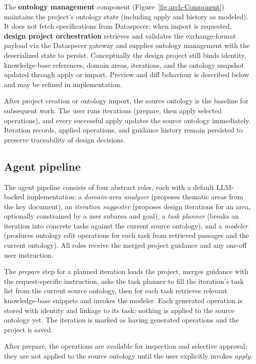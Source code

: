 \documentclass{article}
\begin{document}
The \textbf{ontology management} component (Figure~\ref{fig:arch-Component}) maintains the project's ontology state (including apply and history as modeled). It does not fetch specifications from Dataspecer: when import is requested, \textbf{design project orchestration} retrieves and validates the exchange-format payload via the Dataspecer gateway and supplies ontology management with the deserialized state to persist. Conceptually the design project still binds identity, knowledge-base references, domain areas, iterations, and the ontology snapshot updated through apply or import. Preview and diff behaviour is described below and may be refined in implementation.

After project creation or ontology import, the source ontology is the baseline for subsequent work. The user runs iterations (prepare, then apply selected operations), and every successful apply updates the source ontology immediately. Iteration records, applied operations, and guidance history remain persisted to preserve traceability of design decisions.

\subsection{Agent pipeline}
\label{sec:agent-pipeline}

The agent pipeline consists of four abstract roles, each with a default LLM-backed implementation: a \emph{domain-area analyzer} (proposes thematic areas from the key document), an \emph{iteration suggester} (proposes design iterations for an area, optionally constrained by a user subarea and goal), a \emph{task planner} (breaks an iteration into concrete tasks against the current source ontology), and a \emph{modeler} (produces ontology edit operations for each task from retrieved passages and the current ontology). All roles receive the merged project guidance and any one-off user instruction.

The \emph{prepare} step for a planned iteration loads the project, merges guidance with the request-specific instruction, asks the task planner to fill the iteration's task list from the current source ontology, then for each task retrieves relevant knowledge-base snippets and invokes the modeler. Each generated operation is stored with identity and linkage to its task; nothing is applied to the source ontology yet. The iteration is marked as having generated operations and the project is saved.

After prepare, the operations are available for inspection and selective approval; they are not applied to the source ontology until the user explicitly invokes \emph{apply}.
\end{document}
